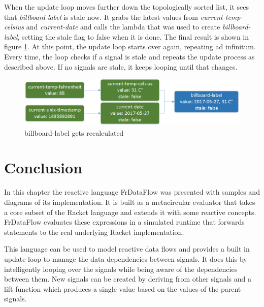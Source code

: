 When the update loop moves further down the topologically sorted list, it sees that \textit{billboard-label} is stale now. It grabs the latest values from \textit{current-temp-celsius} and \textit{current-date} and calls the lambda that was used to create \textit{billboard-label}, setting the stale flag to false when it is done. The final result is shown in figure \ref{fig:language-frdataflow-4}. 
At this point, the update loop starts over again, repeating ad infinitum. Every time, the loop checks if a signal is stale and repeats the update process as described above. If no signals are stale, it keeps looping until that changes. 

\begin{figure}[h]
	\centerline{\includegraphics[width=\textwidth]{images/language-frdataflow-4.png}}
	\caption{billboard-label gets recalculated}
	\label{fig:language-frdataflow-4}
\end{figure}

\section{Conclusion}

In this chapter the reactive language FrDataFlow was presented with samples and diagrams of its implementation.
It is built as a metacircular evaluator that takes a core subset of the Racket language and extends it with some reactive concepts. FrDataFlow evaluates these expressions in a simulated runtime that forwards statements to the real underlying Racket implementation. 

This language can be used to model reactive data flows and provides a built in update loop to manage the data dependencies between signals. It does this by intelligently looping over the signals while being aware of the dependencies between them. New signals can be created by deriving from other signals and a lift function which produces a single value based on the values of the parent signals.